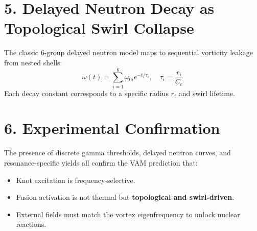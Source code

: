 \documentclass[a4paper, aps,preprint,superscriptaddress, 12pt]{revtex4}
\begin{document}
\section*{5. Delayed Neutron Decay as Topological Swirl Collapse}
The classic 6-group delayed neutron model maps to sequential vorticity leakage from nested shells:
\[
\omega(t) = \sum_{i=1}^6 \omega_{0i} e^{-t/\tau_i}, \quad \tau_i = \frac{r_i}{C_e}
\]
Each decay constant corresponds to a specific radius $r_i$ and swirl lifetime.
\section*{6. Experimental Confirmation}
The presence of discrete gamma thresholds, delayed neutron curves, and resonance-specific yields all confirm the VAM prediction that:
\begin{itemize}
  \item Knot excitation is frequency-selective.
  \item Fusion activation is not thermal but \textbf{topological and swirl-driven}.
  \item External fields must match the vortex eigenfrequency to unlock nuclear reactions.
\end{itemize}
\end{document}
